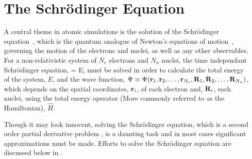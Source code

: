 \section{The Schr\"odinger Equation}
\label{sec:scrodinger}

A central theme in atomic simulations is the solution of the Schr\"odinger equation~\cite{scrodinger-equation-1926}, which is the quantum analogue of Newton's equations of motion~\cite{newton-latin}, governing the motion of the electrons and nuclei, as well as any other observables.
For a non-relativistic system of $N_e$ electrons and $N_n$ nuclei, the time independant Schr\"odinger equation,
 \Psi = E\Psi,
\eeq
must be solved in order to calculate the total energy of the system, $E$, and the wave function, $\Psi \equiv \Psi({\mathrm{\mathbf{\bm{r}}}}_1, {\mathrm{\mathbf{\bm{r}}}}_2, \ldots, {\mathrm{\mathbf{\bm{r}}}}_{N_e}, {\mathrm{\mathbf{\bm{R}}}}_1, {\mathrm{\mathbf{\bm{R}}}}_2, \ldots, {\mathrm{\mathbf{\bm{R}}}}_{N_n})$, which depends on the spatial coordinates, ${\mathrm{\mathbf{\bm{r}}}}_i$, of each electron and, ${\mathrm{\mathbf{\bm{R}}}}_i$, each nuclei, using the total energy operator (More commonly referred to as the Hamiltonian), $\widehat{H}$.

Though it may look innocent, solving the Schr\"odinger equation, which is a second order partial derivative problem , is a daunting task and in most cases significant approximations must be made.
Efforts to solve the Schr\"odinger equation are discussed below in .
